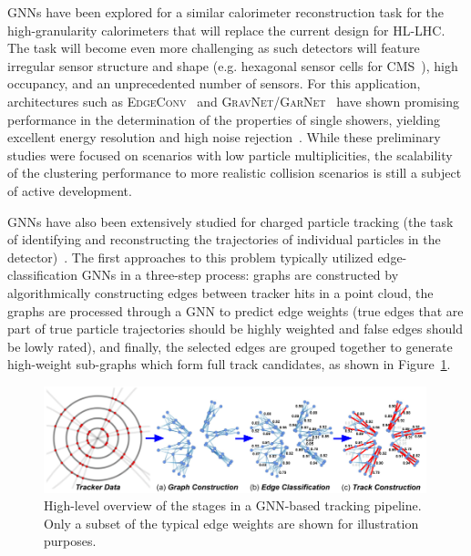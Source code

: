 GNNs have been explored for a similar calorimeter reconstruction task for the high-granularity calorimeters that will replace the current design for HL-LHC. 
The task will become even more challenging as such detectors will feature irregular sensor structure and shape (e.g. hexagonal sensor cells for CMS~\cite{collaboration:2017gbu}), high occupancy, and an unprecedented number of sensors. 
For this application, architectures such as \textsc{EdgeConv}~\cite{DBLP:abs-1801-07829} and \textsc{GravNet/GarNet}~\cite{Qasim:2019otl} have shown promising performance in the determination of the properties of single showers, yielding  excellent energy resolution and high noise rejection~\cite{Ju:2020xty}. 
While these preliminary studies were focused on scenarios with low particle multiplicities, the scalability of the clustering performance to more realistic collision scenarios is still a subject of active development.


GNNs have also been extensively studied for charged particle tracking (the task of identifying and reconstructing the trajectories of individual particles in the detector)~\cite{exatrk_19,duarte_vlimant, heptrkx,dl_tracking}. 
The first approaches to this problem typically utilized edge-classification GNNs in a three-step process: graphs are constructed by algorithmically constructing edges between tracker hits in a point cloud, the graphs are processed through a GNN to predict edge weights (true edges that are part of true particle trajectories should be highly weighted and false edges should be lowly rated), and finally, the selected edges are grouped together to generate high-weight sub-graphs which form full track candidates, as shown in Figure~\ref{fig:gnn_steps}.
\begin{figure}[ht!p]
    \centering
    \includegraphics[width=0.99\textwidth]{figures/GNN_steps.png}
    \caption{High-level overview of the stages in a GNN-based tracking pipeline. Only a subset of the typical edge weights are shown for illustration purposes.}
    \label{fig:gnn_steps}
\end{figure}

